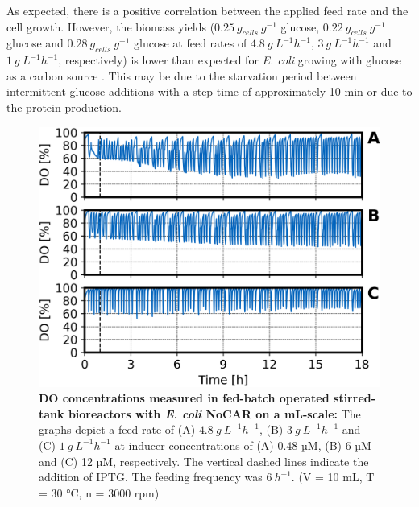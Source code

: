 \documentclass[sn-standardnature]{sn-jnl}%
\theoremstyle{thmstyleone}%
\theoremstyle{thmstyletwo}%
\theoremstyle{thmstylethree}%
\begin{document}
As expected, there is a positive correlation between the applied feed rate and the cell growth.
However, the biomass yields ($0.25\ g_{cells}\ g^{-1}$ glucose, $0.22\ g_{cells}\ g^{-1}$ glucose and $0.28\ g_{cells}\ g^{-1}$ glucose at feed rates of $4.8\ g\ L^{-1} h^{-1}$, $3\ g\ L^{-1} h^{-1}$ and $1\ g\ L^{-1} h^{-1}$, respectively) is lower than expected for \textit{E. coli} growing with glucose as a carbon source \cite{schmideder2015novel}.
This may be due to the starvation period between intermittent glucose additions with a step-time of approximately 10 min or due to the protein production.

\begin{figure}[h]
    \centering
    \includegraphics[width=1.0\textwidth]{figures/O2_overview.png}
    \caption{
        \textbf{DO concentrations measured in fed-batch operated stirred-tank bioreactors with \textit{E. coli} NoCAR on a mL-scale:}
        The graphs depict a feed rate of (A) $4.8\ g\ L^{-1} h^{-1}$, (B) $3\ g\ L^{-1} h^{-1}$ and (C) $1\ g\ L^{-1} h^{-1}$ at inducer concentrations of (A) 0.48 µM, (B) 6 µM and (C) 12 µM, respectively.
        The vertical dashed lines indicate the addition of IPTG.
        The feeding frequency was $6\ h^{-1}$.
        (V = 10 mL, T = 30 °C, n = 3000 rpm)
    }
    \label{fig_o2overview}
\end{figure}
\end{document}
